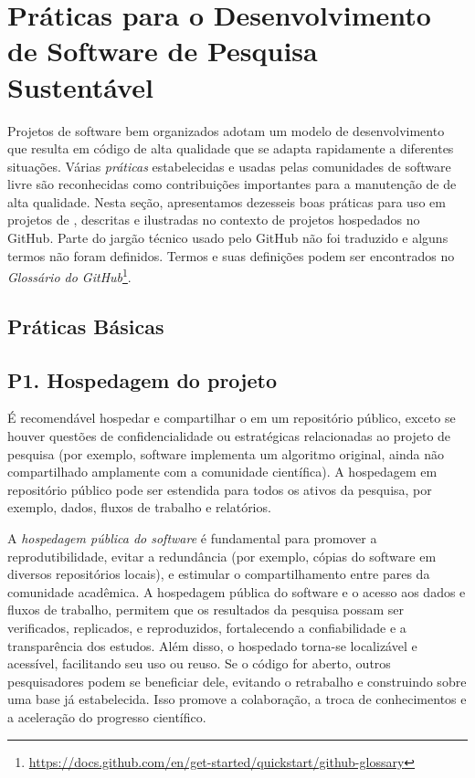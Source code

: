 \section{Práticas para o Desenvolvimento de Software de Pesquisa Sustentável} \label{section:practices}

Projetos de software bem organizados adotam um modelo de desenvolvimento que resulta em código de alta qualidade que se adapta rapidamente a diferentes situações. Várias \textit{práticas} estabelecidas e usadas pelas comunidades de software livre são reconhecidas como contribuições importantes para a manutenção de \RSw de alta qualidade.
%
Nesta seção, apresentamos dezesseis boas práticas para uso em projetos de \RS, descritas e ilustradas no contexto de projetos hospedados no GitHub.
Parte do jargão técnico usado pelo GitHub não foi traduzido e alguns termos não foram definidos. Termos e suas definições podem ser encontrados no \textit{Glossário do GitHub}\footnote{\url{https://docs.github.com/en/get-started/quickstart/github-glossary}}.

\subsection{Práticas Básicas}

\subsection*{P1. Hospedagem do projeto} 

É recomendável hospedar e compartilhar o \RSw em um repositório público, exceto se houver questões de confidencialidade ou estratégicas relacionadas ao projeto de pesquisa (por exemplo, software implementa um algoritmo original, ainda não compartilhado amplamente com a comunidade científica). 
A hospedagem em repositório público pode ser estendida para todos os ativos da pesquisa, por exemplo, dados, fluxos de trabalho e relatórios.

A \textit{hospedagem pública do software} é fundamental para promover a reprodutibilidade, evitar a redundância (por exemplo, cópias do software em diversos repositórios locais), 
e estimular o compartilhamento entre pares da comunidade acadêmica.
%
A hospedagem pública do software e o acesso aos dados e fluxos de trabalho, permitem que os resultados da pesquisa possam ser verificados, replicados, e reproduzidos, fortalecendo a confiabilidade e a transparência dos estudos. 
%
Além disso, o \RSw hospedado torna-se localizável e acessível, facilitando seu uso ou reuso.
Se o código for aberto, outros pesquisadores podem se beneficiar dele, evitando o retrabalho e construindo sobre uma base já estabelecida. Isso promove a colaboração, a troca de conhecimentos e a aceleração do progresso científico.

